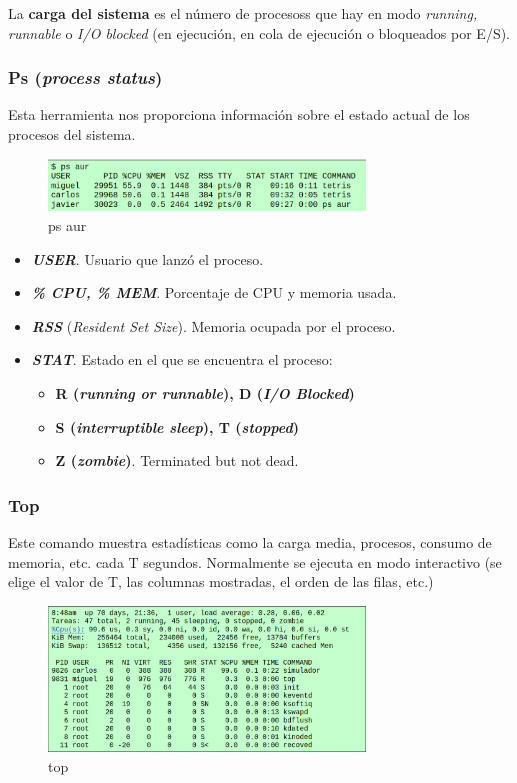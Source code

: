 \documentclass[12pt,spanish]{article}
\begin{document}
La \textbf{carga del sistema} es el número de procesoss que hay en modo \textit{running, runnable} o \textit{I/O blocked} (en ejecución, en cola de ejecución o bloqueados por E/S).

\subsubsection{Ps (\textit{process status})}
Esta herramienta nos proporciona información sobre el estado actual de los procesos del sistema.
\begin{figure}[H]
	\centering
	\includegraphics[width=0.75\textwidth]{psaur.png}
	\caption{ps aur}
\end{figure}

\begin{itemize}
	\item \textbf{\textit{USER}}. Usuario que lanzó el proceso.
	\item \textbf{\textit{\% CPU, \% MEM}}. Porcentaje de CPU y memoria usada.
	\item \textbf{\textit{RSS}} (\textit{Resident Set Size}). Memoria ocupada por el proceso.
	\item \textbf{\textit{STAT}}. Estado en el que se encuentra el proceso:
	\begin{itemize}
		\item \textbf{R (\textit{running or runnable}), D (\textit{I/O Blocked})}
		\item \textbf{S (\textit{interruptible sleep}), T (\textit{stopped})}
		\item \textbf{Z (\textit{zombie})}. Terminated but not dead.
	\end{itemize}
\end{itemize}

\subsubsection{Top}
Este comando muestra estadísticas como la carga media, procesos, consumo de memoria, etc. cada T segundos. Normalmente se ejecuta en modo interactivo (se elige el valor de T, las columnas mostradas, el orden de las filas, etc.)

\begin{figure}[H]
	\centering
	\includegraphics[width=0.75\textwidth]{top.png}
	\caption{top}
\end{figure}
\end{document}
